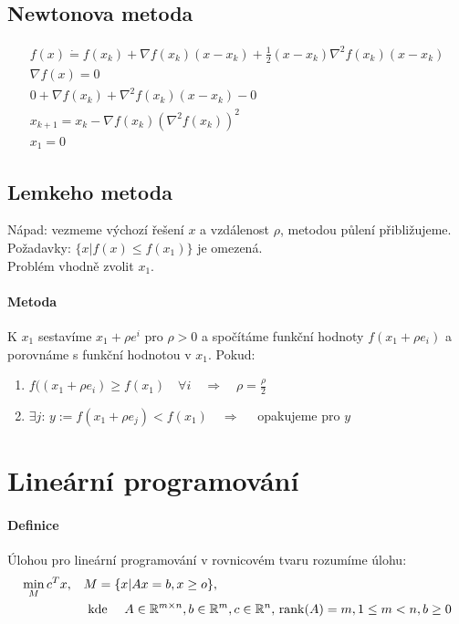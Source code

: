 \documentclass[a4paper,12pt,titlepage]{article}
\begin{document}
\subsection{Newtonova metoda}
\setcounter{equation}{0}
\begin{align}
	f(x) \dot= f(x_k) + \nabla f(x_k)(x-x_k) + \frac{1}{2} (x-x_k) \nabla^2
	f(x_k)(x-x_k) \\
	\nabla f(x) = 0 \\
	0 + \nabla f(x_k) + \nabla^2 f(x_k)(x-x_k) - 0 \\
	x_{k+1} = x_k - \nabla f(x_k)(\nabla^2f(x_k))^2 \\
	x_1 = 0
\end{align}
\subsection{Lemkeho metoda}
\setcounter{equation}{0}
Nápad: vezmeme výchozí řešení $x$ a vzdálenost $\rho$, metodou půlení přibližujeme.\\
Požadavky: $\{ x | f(x) \le f(x_1) \}$ je omezená. \\
Problém vhodně  zvolit $x_1$.
\paragraph{Metoda} K $x_1$ sestavíme $x_1 + \rho e^i$ pro $\rho > 0$ a spočítáme funkční
hodnoty $f(x_1 + \rho e_i)$ a porovnáme s funkční hodnotou v $x_1$. Pokud:
\begin{enumerate}
	\item $f((x_1 + \rho e_i) \ge f(x_1) \quad \forall i \quad \Rightarrow \quad
	\rho = \frac{\rho}{2}$
	\item $\exists j$: $y := f(x_1 + \rho e_j) < f(x_1) \quad \Rightarrow \quad$
	opakujeme pro $y$
\end{enumerate}


\section{Lineární programování}
\setcounter{equation}{0}
\paragraph{Definice}
Úlohou pro lineární programování v rovnicovém tvaru rozumíme úlohu:
\begin{align}
	\min_M c^T x, \quad &M = \{ x | Ax = b, x \ge o \},\\ 
	&\text{ kde } \quad A \in \mathbb{R}^{m \times
	n }, b \in \mathbb{R}^m, c \in \mathbb{R}^n, \operatorname*{\,rank}(A) = m, 1 \le m < n, b \ge 0
\end{align}
\end{document}

